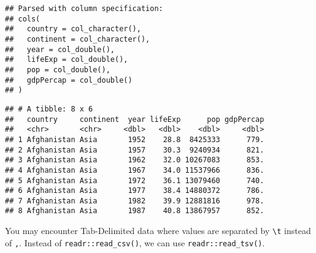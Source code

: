 \documentclass[
]{book}
\begin{document}
\begin{verbatim}
## Parsed with column specification:
## cols(
##   country = col_character(),
##   continent = col_character(),
##   year = col_double(),
##   lifeExp = col_double(),
##   pop = col_double(),
##   gdpPercap = col_double()
## )
\end{verbatim}

\begin{verbatim}
## # A tibble: 8 x 6
##   country     continent  year lifeExp      pop gdpPercap
##   <chr>       <chr>     <dbl>   <dbl>    <dbl>     <dbl>
## 1 Afghanistan Asia       1952    28.8  8425333      779.
## 2 Afghanistan Asia       1957    30.3  9240934      821.
## 3 Afghanistan Asia       1962    32.0 10267083      853.
## 4 Afghanistan Asia       1967    34.0 11537966      836.
## 5 Afghanistan Asia       1972    36.1 13079460      740.
## 6 Afghanistan Asia       1977    38.4 14880372      786.
## 7 Afghanistan Asia       1982    39.9 12881816      978.
## 8 Afghanistan Asia       1987    40.8 13867957      852.
\end{verbatim}

You may encounter Tab-Delimited data where values are separated by \texttt{\textbackslash{}t} instead of \texttt{,}. Instead of \texttt{readr::read\_csv()}, we can use \texttt{readr::read\_tsv()}.
\end{document}

